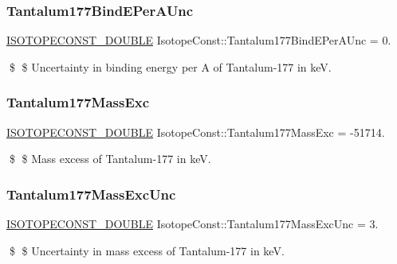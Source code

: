 \subsubsection{\texorpdfstring{Tantalum177\+Bind\+E\+Per\+A\+Unc}{Tantalum177BindEPerAUnc}}
{\footnotesize\ttfamily \mbox{\hyperlink{group___isotope_const-_macros_ga8f45a7272ce02c0b4c65c44636ed719a}{I\+S\+O\+T\+O\+P\+E\+C\+O\+N\+S\+T\+\_\+\+D\+O\+U\+B\+LE}} Isotope\+Const\+::\+Tantalum177\+Bind\+E\+Per\+A\+Unc = 0.}

\$ \$ Uncertainty in binding energy per A of Tantalum-\/177 in keV. \mbox{\label{group___isotope_const-_tantalum-_ta177_ga92ce23afff41b48700008dbc3b910eea}} 
\subsubsection{\texorpdfstring{Tantalum177\+Mass\+Exc}{Tantalum177MassExc}}
{\footnotesize\ttfamily \mbox{\hyperlink{group___isotope_const-_macros_ga8f45a7272ce02c0b4c65c44636ed719a}{I\+S\+O\+T\+O\+P\+E\+C\+O\+N\+S\+T\+\_\+\+D\+O\+U\+B\+LE}} Isotope\+Const\+::\+Tantalum177\+Mass\+Exc = -\/51714.}

\$ \$ Mass excess of Tantalum-\/177 in keV. \mbox{\label{group___isotope_const-_tantalum-_ta177_ga5a56c02cd8f9e8b2408fa37b142309d9}} 
\subsubsection{\texorpdfstring{Tantalum177\+Mass\+Exc\+Unc}{Tantalum177MassExcUnc}}
{\footnotesize\ttfamily \mbox{\hyperlink{group___isotope_const-_macros_ga8f45a7272ce02c0b4c65c44636ed719a}{I\+S\+O\+T\+O\+P\+E\+C\+O\+N\+S\+T\+\_\+\+D\+O\+U\+B\+LE}} Isotope\+Const\+::\+Tantalum177\+Mass\+Exc\+Unc = 3.}

\$ \$ Uncertainty in mass excess of Tantalum-\/177 in keV. \mbox{\label{group___isotope_const-_tantalum-_ta177_ga0692b132600385064080742b7983e039}} 
